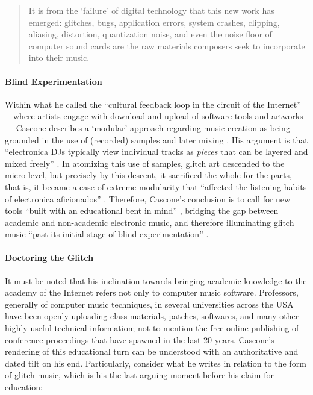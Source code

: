 \begin{quote}
	It is from the `failure' of digital technology that this new work has emerged: glitches, bugs, application errors, system crashes, clipping, aliasing, distortion, quantization noise, and even the noise floor of computer sound cards are the raw materials composers seek to incorporate into their music. \parencite[13]{Cas00:The}
\end{quote}

\paragraph{Blind Experimentation}
Within what he called the ``cultural feedback loop in the circuit of the Internet'' ---where artists engage with download and upload of software tools and artworks--- Cascone describes a `modular' approach regarding music creation as being grounded in the use of (recorded) samples and later mixing \parencite[17]{Cas00:The}. His argument is that ``electronica DJs typically view individual tracks as \textit{pieces} that can be layered and mixed freely'' \im \parencite[17]{Cas00:The}. In atomizing this use of samples, glitch art descended to the micro-level, but precisely by this descent, it sacrificed the whole for the parts, that is, it became a case of extreme modularity that ``affected the listening habits of electronica aficionados'' \parencite[17]{Cas00:The}. Therefore, Cascone's conclusion is to call for new tools ``built with an educational bent in mind'' \parencite[17]{Cas00:The}, bridging the gap between academic and non-academic electronic music, and therefore illuminating glitch music ``past its initial stage of blind experimentation'' \parencite[17]{Cas00:The}. 

\paragraph{Doctoring the Glitch}
It must be noted that his inclination towards bringing academic knowledge to the academy of the Internet refers not only to computer music software. Professors, generally of computer music techniques, in several universities across the USA have been openly uploading class materials, patches, softwares, and many other highly useful technical information; not to mention the free online publishing of conference proceedings that have spawned in the last 20 years. Cascone's rendering of this educational turn can be understood with an authoritative and dated tilt on his end. Particularly, consider what he writes in relation to the form of glitch music, which is his the last arguing moment before his claim for education:

